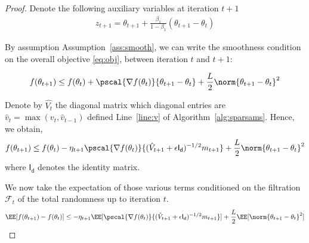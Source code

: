 \documentclass[11pt]{article}
\begin{document}
\begin{proof}





Denote the following auxiliary variables at iteration $t+1$
\begin{align}
z_{t+1} = \theta_{t+1} + \frac{\beta_1}{1-\beta_1}(\theta_{t+1} - \theta_{t})
\end{align}

By assumption Assumption~\ref{ass:smooth}, we can write the smoothness condition on the overall objective \eqref{eq:obj}, between iteration $t$ and $t+1$:

\begin{equation}
f(\theta_{t+1}) \leq f(\theta_{t})+  \pscal{\nabla f(\theta_t)}{\theta_{t+1} - \theta_{t}} + \frac{L}{2} \norm{\theta_{t+1} - \theta_{t}}^2
\end{equation}

Denote by $\hat{V_t}$ the diagonal matrix which diagonal entries are $\hat v_t=\max(v_t,\hat v_{t-1})$ defined Line~\ref{line:v} of Algorithm~\ref{alg:sparsams}.
Hence, we obtain,
\begin{equation}
f(\theta_{t+1}) \leq f(\theta_{t}) - \eta_{t+1} \pscal{\nabla f(\theta_t)}{(\hat{V}_{t+1} + \epsilon \mathsf{I_d})^{-1/2} m_{t+1}} + \frac{L}{2} \norm{\theta_{t+1} - \theta_{t}}^2
\end{equation}
where $\mathsf{I_d}$ denotes the identity matrix.

We now take the expectation of those various terms conditioned on the filtration $\mathcal{F}_t$ of the total randomness up to iteration $t$.
\begin{equation}\label{eq:smooth1}
\EE[f(\theta_{t+1}) - f(\theta_{t}) ] \leq - \eta_{t+1} \EE[\pscal{\nabla f(\theta_t)}{(\hat{V}_{t+1} + \epsilon \mathsf{I_d})^{-1/2} m_{t+1}}] + \frac{L}{2} \EE[\norm{\theta_{t+1} - \theta_{t}}^2]
\end{equation}


\end{proof}
\end{document}
